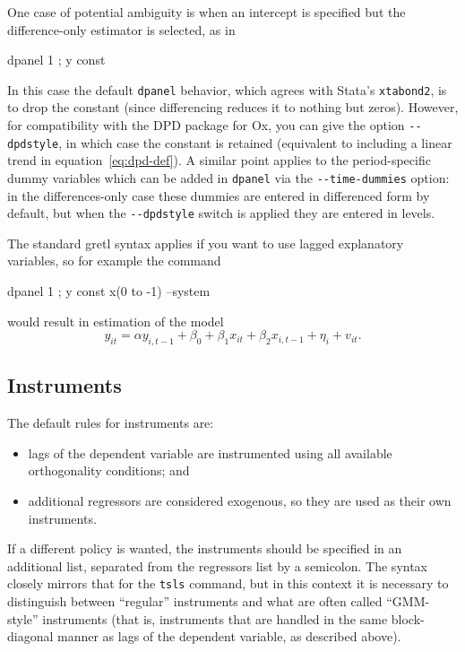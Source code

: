 One case of potential ambiguity is when an intercept is specified but
the difference-only estimator is selected, as in
\begin{code}
  dpanel 1 ; y const
\end{code}
In this case the default \texttt{dpanel} behavior, which agrees with
Stata's \texttt{xtabond2}, is to drop the constant (since differencing
reduces it to nothing but zeros). However, for compatibility with the
DPD package for Ox, you can give the option \verb|--dpdstyle|, in
which case the constant is retained (equivalent to including a linear
trend in equation~\ref{eq:dpd-def}).  A similar point applies to the
period-specific dummy variables which can be added in \texttt{dpanel}
via the \verb|--time-dummies| option: in the differences-only case
these dummies are entered in differenced form by default, but when the
\verb|--dpdstyle| switch is applied they are entered in levels.

The standard gretl syntax applies if you want to use lagged
explanatory variables, so for example the command
\begin{code}
  dpanel 1 ; y const x(0 to -1) --system
\end{code}
would result in estimation of the model
\[
  y_{it} = \alpha y_{i,t-1} + 
  \beta_0 + \beta_1 x_{it} + \beta_2 x_{i,t-1} +
  \eta_{i} + v_{it} .
\]


\subsection{Instruments}

The default rules for instruments are: 
\begin{itemize}
\item lags of the dependent variable are instrumented using all
  available orthogonality conditions; and
\item additional regressors are considered exogenous, so they are used
  as their own instruments.
\end{itemize}

If a different policy is wanted, the instruments should be specified
in an additional list, separated from the regressors list by a
semicolon. The syntax closely mirrors that for the \texttt{tsls}
command, but in this context it is necessary to distinguish between
``regular'' instruments and what are often called ``GMM-style''
instruments (that is, instruments that are handled in the same
block-diagonal manner as lags of the dependent variable, as described
above).

